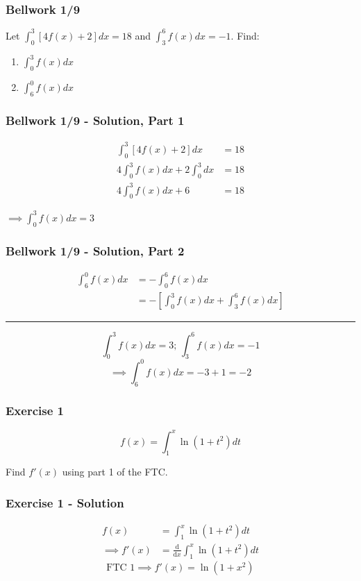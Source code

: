 \documentclass[12pt]{beamer}
\begin{document}
\begin{frame}
	\frametitle{Bellwork 1/9}
	\initclock

	\vfill
	\vfill
	\large
	Let $\int_{0}^{3}[4f(x)+2]dx=18$ and $\int_{3}^{6}f(x)dx=-1$.
	\vfill
	Find:
	\Large
	\begin{enumerate}\itemsep2ex
		\item $\int_{0}^{3}f(x)dx$
		\item $\int_{6}^{0}f(x)dx$
	\end{enumerate}
	\vfill
	\vfill
	\vfill
	\vfill

	\small
	\crono
\end{frame}
\begin{frame}
	\frametitle{Bellwork 1/9 - Solution, Part 1}

	\large
	\begin{align*}
		\int_{0}^{3}[4f(x)+2]dx               & = 18 \\
		4\int_{0}^{3}f(x)dx + 2\int_{0}^{3}dx & = 18 \\
		4\int_{0}^{3}f(x)dx + 6               & = 18
	\end{align*}
	\begin{center}
		$\implies \boxed{\int_{0}^{3}f(x)dx = 3}$
	\end{center}
\end{frame}
\begin{frame}
	\frametitle{Bellwork 1/9 - Solution, Part 2}

	\begin{align*}
		\int_{6}^{0}f(x)dx &= -\int_{0}^{6}f(x)dx \\
		&= -\left[\int_{0}^{3}f(x)dx + \int_{3}^{6}f(x)dx\right]
	\end{align*}
	\vfill
	\hrule
	\vfill
	\[\int_{0}^{3}f(x)dx=3\text{; }\int_{3}^{6}f(x)dx=-1\]
	\[\implies \boxed{\int_{6}^{0}f(x)dx = -3 + 1 = -2}\]
\end{frame}
\begin{frame}
	\frametitle{Exercise 1}

	\vfill
	\vfill
	\Large
	\[f(x)=\int_{1}^{x}\ln(1+t^2)dt\]
	\vfill
	\begin{center}
		Find $f'(x)$ using part 1 of the FTC.
	\end{center}
	\vfill
	\vfill
\end{frame}
\begin{frame}
	\frametitle{Exercise 1 - Solution}

	\vfill
	\Large
	\begin{align*}
		f(x)           & = \int_{1}^{x}\ln(1+t^2)dt                               \\
		\implies f'(x) & = \frac{\mathrm{d}}{\mathrm{d}x}\int_{1}^{x}\ln(1+t^2)dt
	\end{align*}
	\vfill
	\[\text{FTC 1}\implies \boxed{f'(x) = \ln(1+x^2)}\]
\end{frame}
\end{document}
